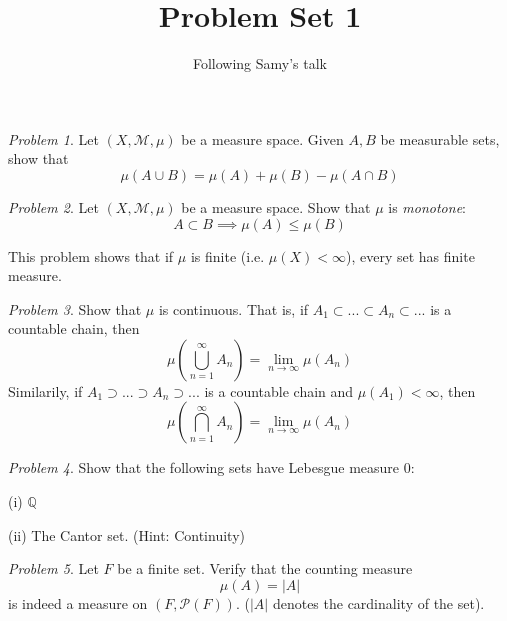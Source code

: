 \documentclass[11pt]{article}
\title{Problem Set 1}
\author{Following Samy's talk}
\date{}
\theoremstyle{definition}
\theoremstyle{example}
\theoremstyle{remark}
\theoremstyle{lemma}
\theoremstyle{proposition}
\theoremstyle{Problem}
\newtheorem{problem}{Problem}[section]
\theoremstyle{Solution}
\theoremstyle{theorem}
\theoremstyle{corollary}
\begin{document}
\maketitle
\begin{problem}
Let $(X,\mathcal{M},\mu)$ be a measure space. Given $A,B$ be measurable sets, show that $$\mu(A\cup B) = \mu(A)+\mu(B) - \mu(A\cap B)$$
\end{problem}

\begin{problem}
Let $(X,\mathcal{M},\mu)$ be a measure space. Show that $\mu$ is \emph{monotone}:
$$A\subset B \implies \mu(A) \leq \mu(B)$$
\end{problem}
This problem shows that if $\mu$ is finite (i.e. $\mu(X) <\infty$), every set has finite measure.

\begin{problem}
Show that $\mu$ is continuous. That is, if $A_1\subset ... \subset A_n \subset ...$ is a countable chain, then $$\mu\left(\bigcup_{n=1}^{\infty} A_n\right) = \lim_{n\to \infty} \mu(A_n)$$
Similarily, if $A_1 \supset  ... \supset A_n \supset ...$ is a countable chain and $\mu(A_1)<\infty$, then
$$\mu\left(\bigcap_{n=1}^{\infty} A_n\right) = \lim_{n\to \infty} \mu(A_n)$$
\end{problem}

\begin{problem}
Show that the following sets have Lebesgue measure $0$:

(i) $\mathbb{Q}$ 

(ii) The Cantor set. (Hint: Continuity)

\end{problem}

\begin{problem}
Let $F$ be a finite set. Verify that the counting measure 
$$\mu(A) = |A|$$
is indeed a measure on $(F, \mathcal{P}(F))$. ($|A|$ denotes the cardinality of the set).
\end{problem}
\end{document}
